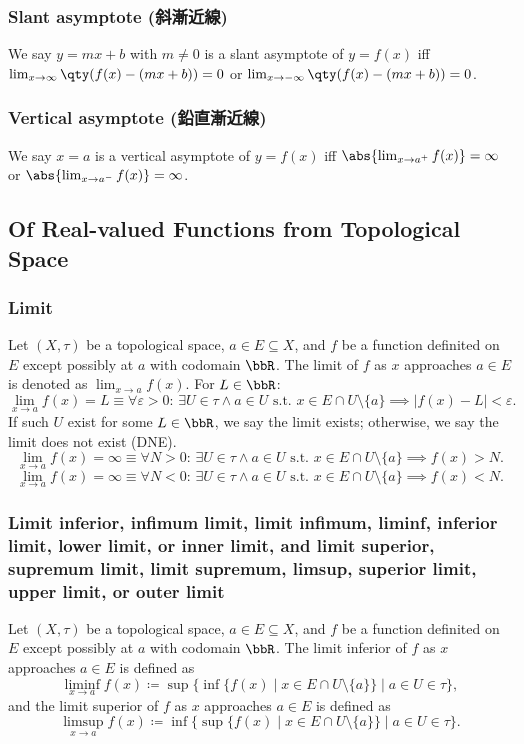 \documentclass[a4paper,12pt]{report}
\begin{document}
\subsubsection{Slant asymptote (斜漸近線)}
We say $y=mx+b$ with $m\neq 0$ is a slant asymptote of $y=f(x)$ iff $\lim_{x \to \infty} \qty(f(x)-(mx+b))=0$ or $\lim_{x \to -\infty} \qty(f(x)-(mx+b))=0$.
\subsubsection{Vertical asymptote (鉛直漸近線)}
We say $x=a$ is a vertical asymptote of $y=f(x)$ iff $\abs{\lim_{x \to a^+} f(x)}=\infty$ or $\abs{\lim_{x \to a^-} f(x)}=\infty$.
\subsection{Of Real-valued Functions from Topological Space}
\subsubsection{Limit}
Let $(X,\tau)$ be a topological space, $a\in E\subseteq X$, and $f$ be a function definited on $E$ except possibly at $a$ with codomain $\bbR$. The limit of $f$ as $x$ approaches $a\in E$ is denoted as $\lim_{x\to a}f(x)$. For $L\in\bbR$:
\[\lim_{x \to a} f(x) = L \equiv \forall \varepsilon > 0:\, \exists U\in\tau\land a\in U \text{\ s.t.\ } x\in E\cap U\setminus\{a\} \implies |f(x) - L| < \varepsilon.\]
If such $U$ exist for some $L\in\bbR$, we say the limit exists; otherwise, we say the limit does not exist (DNE).
\[\lim_{x\to a}f(x)=\infty \equiv \forall N > 0:\, \exists U\in\tau\land a\in U \text{\ s.t.\ }x\in E\cap U\setminus\{a\}\implies f(x) > N.\]
\[\lim_{x\to a}f(x)=\infty \equiv \forall N < 0:\, \exists U\in\tau\land a\in U \text{\ s.t.\ }x\in E\cap U\setminus\{a\}\implies f(x) < N.\]
\subsubsection{Limit inferior, infimum limit, limit infimum, liminf, inferior limit, lower limit, or inner limit, and limit superior, supremum limit, limit supremum, limsup, superior limit, upper limit, or outer limit}
Let $(X,\tau)$ be a topological space, $a\in E\subseteq X$, and $f$ be a function definited on $E$ except possibly at $a$ with codomain $\bbR$. The limit inferior of $f$ as $x$ approaches $a\in E$ is defined as
\[\liminf_{x\to a}f(x)\coloneq\sup\{\inf\{f(x)\mid x\in E\cap U\setminus\{a\}\}\mid a\in U\in\tau\},\]
and the limit superior of $f$ as $x$ approaches $a\in E$ is defined as
\[\limsup_{x\to a}f(x)\coloneq\inf\{\sup\{f(x)\mid x\in E\cap U\setminus\{a\}\}\mid a\in U\in\tau\}.\]
\end{document}
